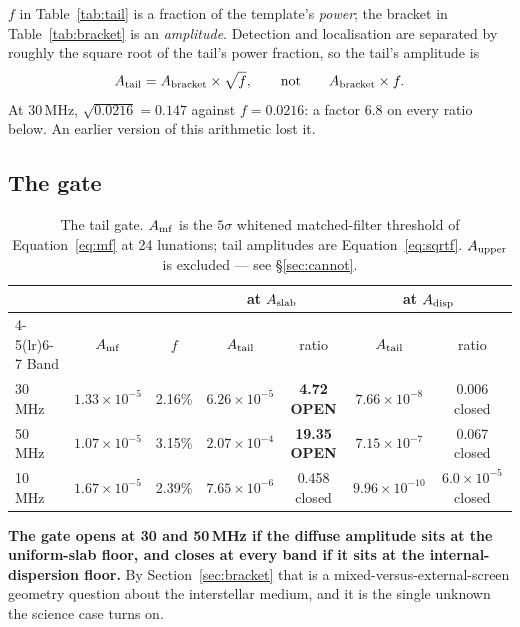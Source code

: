 \documentclass[11pt]{article}
\begin{document}
$f$ in Table~\ref{tab:tail} is a fraction of the template's
\emph{power}; the bracket in Table~\ref{tab:bracket} is an
\emph{amplitude}. Detection and localisation are separated by roughly the
square root of the tail's power fraction, so the tail's amplitude is
\begin{equation}
  A_{\rm tail} = A_{\rm bracket} \times \sqrt{f},
  \qquad\text{not}\qquad A_{\rm bracket}\times f .
  \label{eq:sqrtf}
\end{equation}
At 30\,MHz, $\sqrt{0.0216} = 0.147$ against $f = 0.0216$: a factor
$6.8$ on every ratio below. An earlier version of this arithmetic lost
it.

\subsection{The gate}

\begin{table}[htbp]
  \centering
  \caption{The tail gate. $A_{\rm mf}$ is the $5\sigma$ whitened
  matched-filter threshold of Equation~\eqref{eq:mf} at 24 lunations;
  tail amplitudes are Equation~\eqref{eq:sqrtf}. $A_{\rm upper}$ is
  excluded --- see \S\ref{sec:cannot}.}
  \label{tab:verdict}
  \begin{tabular}{lcc cc cc}
    \toprule
    & & & \multicolumn{2}{c}{at $A_{\rm slab}$}
      & \multicolumn{2}{c}{at $A_{\rm disp}$} \\
    \cmidrule(lr){4-5}\cmidrule(lr){6-7}
    Band & $A_{\rm mf}$ & $f$ & $A_{\rm tail}$ & ratio
      & $A_{\rm tail}$ & ratio \\
    \midrule
    30\,MHz & $1.33\times10^{-5}$ & 2.16\%
      & $6.26\times10^{-5}$ & \textbf{4.72 OPEN}
      & $7.66\times10^{-8}$ & 0.006 closed \\
    50\,MHz & $1.07\times10^{-5}$ & 3.15\%
      & $2.07\times10^{-4}$ & \textbf{19.35 OPEN}
      & $7.15\times10^{-7}$ & 0.067 closed \\
    10\,MHz & $1.67\times10^{-5}$ & 2.39\%
      & $7.65\times10^{-6}$ & 0.458 closed
      & $9.96\times10^{-10}$ & $6.0\times10^{-5}$ closed \\
    \bottomrule
  \end{tabular}
\end{table}

\textbf{The gate opens at 30 and 50\,MHz if the diffuse amplitude sits at
the uniform-slab floor, and closes at every band if it sits at the
internal-dispersion floor.} By Section~\ref{sec:bracket} that is a
mixed-versus-external-screen geometry question about the interstellar
medium, and it is the single unknown the science case turns on.
\end{document}
